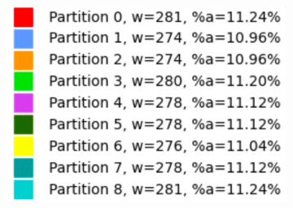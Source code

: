 \begin{figure}[h]
\centering
\begin{subfigure}{.33\textwidth}
    \centering
    \caption[short]{}
\end{subfigure}%
\begin{subfigure}{.33\textwidth}
    \centering
    \caption[short]{}
\end{subfigure}%
\begin{subfigure}{.33\textwidth}
    \centering
    \includegraphics[width=0.9\linewidth]{images/results/m_k/with/3/results}

\end{subfigure}
\end{figure}
